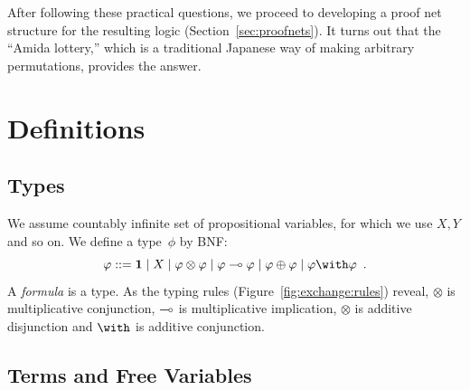 After following these practical questions,
we proceed to developing a proof net structure for the resulting logic
(Section~\ref{sec:proofnets}).
It turns out that the ``Amida lottery,'' which is a traditional
Japanese way of making arbitrary permutations, provides the answer.

\section{Definitions}

\subsection{Types}
We assume countably infinite set of propositional variables, for which
we use $X,Y$ and so on.
We define a type~$\phi$ by BNF:
\[
 \phi::=\one \mid X \mid \phi\otimes\phi\mid \phi\limp\phi\mid
 \phi\oplus\phi\mid \phi\with\phi\enspace.
\]
A \textit{formula} is a type.
As the typing rules (Figure~\ref{fig:exchange:rules}) reveal,
$\otimes$ is multiplicative conjunction,
$\multimap$ is multiplicative implication,
$\otimes$ is additive disjunction and
$\with$ is additive conjunction.

\subsection{Terms and Free Variables}

